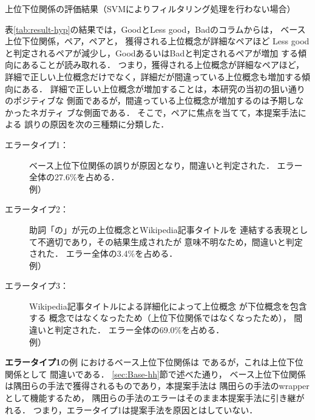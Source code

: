 \documentclass[japanese]{jnlp_1.4}
\newcommand{\thype}{}
\newcommand{\ghype}{}
\newcommand{\isa}[2]{}
\begin{document}
\begin{table}[t]
\caption{上位下位関係の評価結果（SVMによりフィルタリング処理を行わない場合）}
\label{tab:result-hyp2}

\end{table}



表\ref{tab:result-hyp}の結果では，GoodとLess good，Badのコラムからは，
ベース上位下位関係，\ghype{}ペア，\thype{}ペアと，
獲得される上位概念が詳細なペアほど
Less goodと判定されるペアが減少し，GoodあるいはBadと判定されるペアが増加
する傾向にあることが読み取れる．
つまり，獲得される上位概念が詳細なペアほど，
詳細で正しい上位概念だけでなく，詳細だが間違っている上位概念も増加する傾
向にある．
詳細で正しい上位概念が増加することは，本研究の当初の狙い通りのポジティブな
側面であるが，間違っている上位概念が増加するのは予期しなかったネガティ
ブな側面である．
そこで，\thype{}ペアに焦点を当てて，本提案手法による
誤りの原因を次の三種類に分類した．

\begin{description}
 \item[エラータイプ1：] ベース上位下位関係の誤りが原因となり，間違いと判定された．
	    エラー全体の27.6\%を占める．\\
	    例）\isa{リンチバーグのヘリテイジ高校}{ペリーモン小学校}
 \item[エラータイプ2：] 助詞「の」が元の上位概念とWikipedia記事タイトルを
	    連結する表現として不適切であり，その結果生成された\thype{}が
	    意味不明なため，間違いと判定された．
	    エラー全体の3.4\%を占める．\\
	    例）\isa{原山理一郎のアナウンサー}{小林豊}
 \item[エラータイプ3：] Wikipedia記事タイトルによる詳細化によって上位概念
	    が下位概念を包含する
	    概念ではなくなったため（上位下位関係ではなくなったため），
	    間違いと判定された．
	    エラー全体の69.0\%を占める．\\
	    例）\isa{大垣市の公共施設}{図書館}
\end{description}

\textbf{エラータイプ1}の例
\isa{リンチバーグのヘリテイジ高校}{ペリーモン小学校}におけるベース上位下位関係は
\isa{ヘリテイジ高校}{ペリーモン小学校}であるが，これは上位下位関係として
間違いである．
\ref{sec:Base-hh}節で述べた通り，
ベース上位下位関係は隅田らの手法で獲得されるものであり，本提案手法は
隅田らの手法のwrapperとして機能するため，
隅田らの手法のエラーはそのまま本提案手法に引き継がれる．
つまり，エラータイプ1は提案手法を原因とはしていない．
\end{document}

